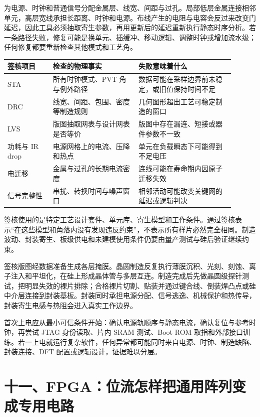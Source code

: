 为电源、时钟和普通信号分配金属层、线宽、间距与过孔。局部低层金属连接相邻单元，高层宽线承担长距离、时钟和电源。布线产生的电阻与电容会反过来改变门延迟，因此工具必须抽取寄生参数，再用更新后的延迟重新执行静态时序分析。若一条路径失败，修复可能是换单元、插缓冲、移动逻辑、调整时钟或增加流水级；任何修复都要重新检查其他模式和工艺角。


\begin{longtable}{L{0.18\linewidth}L{0.34\linewidth}L{0.38\linewidth}}
\toprule
签核项目 & 检查的物理事实 & 失败意味着什么 \\
\midrule
STA & 所有时钟模式、PVT 角与例外路径 & 数据可能在采样边界前未稳定，或旧值保持时间不足 \\\tablerowrule
DRC & 线宽、间距、包围、密度等制造规则 & 几何图形超出工艺可稳定制造的窗口 \\\tablerowrule
LVS & 版图抽取网表与设计网表是否等价 & 版图中存在漏连、短接或器件参数不一致 \\\tablerowrule
功耗与 IR drop & 电源网格上的电流、压降和热点 & 单元在负载瞬态下可能得到不足电压 \\\tablerowrule
电迁移 & 金属与过孔的长期电流密度 & 连线可能在寿命期内因原子迁移失效 \\\tablerowrule
信号完整性 & 串扰、转换时间与噪声窗口 & 相邻活动可能改变关键网的延迟或逻辑判决 \\
\bottomrule
\end{longtable}

签核使用的是特定工艺设计套件、单元库、寄生模型和工作条件。通过签核表示“在这些模型和角落内没有发现违反约束”，不表示所有样片必然完全相同。制造波动、封装寄生、板级供电和未建模使用条件仍要由量产测试与硅后验证继续约束。


签核版图经数据准备生成各层掩膜。晶圆制造反复执行薄膜沉积、光刻、刻蚀、离子注入和平坦化，在硅上形成晶体管与多层互连。制造完成后先做晶圆级探针测试，把明显失效的裸片排除；合格裸片切割、贴装并通过键合线、倒装焊凸点或硅中介层连接到封装基板。封装同时承担电源分配、信号逃逸、机械保护和热传导，封装寄生电感与热阻会进入真实工作边界。

首次上电应从最小可信条件开始：确认电源轨顺序与静态电流，确认复位与参考时钟，再尝试 JTAG 身份读取、片内 SRAM 测试、Boot ROM 取指和外部接口训练。若一上电就运行复杂软件，任何异常都可能同时来自电源、时钟、制造缺陷、封装连接、DFT 配置或逻辑设计，证据难以分层。

\section{十一、FPGA：位流怎样把通用阵列变成专用电路}

